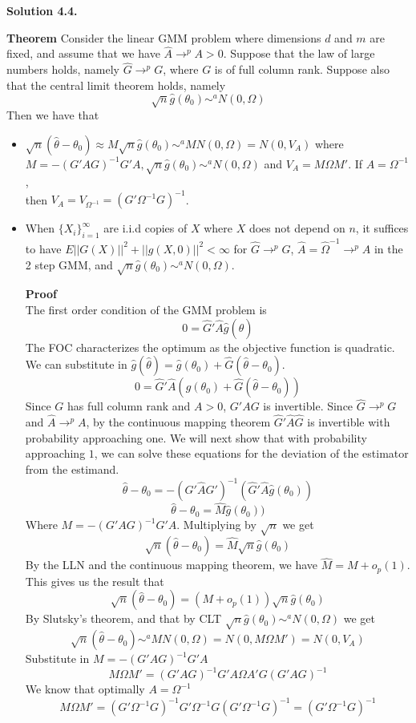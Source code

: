 \documentclass[11pt]{article}
\newenvironment{solution}[1]
    {\bigskip\noindent\textbf{Solution #1.} \par}
    {\medskip}
\begin{document}
\begin{solution}{4.4}
\textbf{Theorem} Consider the linear GMM problem where dimensions $d$ and $m$ are fixed, and assume that we have $\hat{A} \to^p A >0$. Suppose that the law of large numbers holds, namely $\hat{G} \to^p G$, where $G$ is of full column rank. Suppose also that the central limit theorem holds, namely 
\[\sqrt{n}\hat{g}(\theta_0) \sim^a N(0, \Omega)\]
Then we have that 
\begin{itemize}
    \item $\sqrt{n}(\hat{\theta} - \theta_0) \approx M\sqrt{n}\hat{g}(\theta_0) \sim^a MN(0, \Omega) = N(0, V_A)$ where \\ $M=-(G'AG)^{-1}G'A, \sqrt{n}\hat{g}(\theta_0) \sim^a N(0, \Omega)$ and $V_A=M\Omega M'$. If $A=\Omega^{-1}$, \\
    then $V_A=V_{\Omega^{-1}} = (G'\Omega^{-1}G)^{-1}$. 
    \item When $\{X_i\}_{i=1}^{\infty}$ are i.i.d copies of $X$ where $X$ does not depend on $n$, it suffices to have $E||G(X)||^2 + ||g(X,0)||^2<\infty$ for $\hat{G} \to^p G$, $\hat{A} =\hat{\Omega}^{-1} \to^p A$ in the 2 step GMM, and $\sqrt{n}\hat{g}(\theta_0) \sim^a N(0, \Omega)$. 

    \textbf{Proof} \\
    The first order condition of the GMM problem is 
    \[0 = \hat{G}'\hat{A}\hat{g}(\hat{\theta})\]
    The FOC characterizes the optimum as the objective function is quadratic. We can substitute in $\hat{g}(\hat{\theta}) = \hat{g}(\theta_0) + \hat{G}(\hat{\theta} - \theta_0)$.
    \[0 = \hat{G}'\hat{A}\left(\hat{g}(\theta_0) + \hat{G}(\hat{\theta} - \theta_0)\right)\]
   Since $G$ has full column rank and $A>0$, $G'AG$ is invertible. Since $\hat{G} \to^p G$ and $\hat{A} \to^p A$, by the continuous mapping theorem $\hat{G}'\hat{A}\hat{G}$ is invertible with probability approaching one. We will next show that with probability approaching $1$, we can solve these equations for the deviation of the estimator from the estimand.
   \[\hat{\theta}-\theta_0 = -(\hat{G}'\hat{A}G')^{-1}(\hat{G}'\hat{A}\hat{g}(\theta_0))\]
   \[\hat{\theta}-\theta_0 = \hat{M}\hat{g}(\theta_0))\]
   Where $M=-(G'AG)^{-1}G'A$. Multiplying by $\sqrt{n}$ we get 
    \[\sqrt{n}(\hat{\theta}-\theta_0) = \hat{M}\sqrt{n}\hat{g}(\theta_0)\]  By the LLN and the continuous mapping theorem, we have $\hat{M} = M + o_p(1)$. This gives us the result that 
    \[\sqrt{n}(\hat{\theta}- \theta_0) = (M+o_p(1))\sqrt{n}\hat{g}(\theta_0)\]
    By Slutsky's theorem, and that by CLT $\sqrt{n}\hat{g}(\theta_0) \sim^a N(0, \Omega)$ we get
    \[\sqrt{n}(\hat{\theta} - \theta_0) \sim^a MN(0, \Omega) = N(0, M\Omega M') = N(0, V_A)\]
    Substitute in $M=-(G'AG)^{-1}G'A$
    \[M\Omega M' = (G'AG)^{-1}G'A \Omega A'G(G'AG)^{-1}\]
    We know that optimally $A=\Omega^{-1}$
    \[M\Omega M' = (G'\Omega^{-1}G)^{-1}G' \Omega^{-1}G(G'\Omega^{-1}G)^{-1} = (G'\Omega^{-1}G)^{-1}\]
    
\end{itemize}
    
\end{solution}
\end{document}
